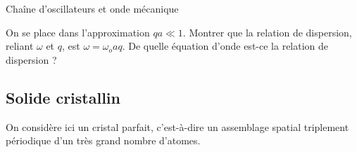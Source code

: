 \begin{exo}[PC][1][devoir]{Chaîne d'oscillateurs et onde mécanique}
\begin{quest}
\item On se place dans l'approximation $qa \ll 1$. Montrer que la relation de dispersion, reliant $\omega$ et $q$, est $\omega=\omega_{o}a q$. De quelle équation d'onde est-ce la relation de dispersion ?






\end{quest}

\subsection{Solide cristallin}
On considère ici un cristal parfait, c'est-à-dire un assemblage spatial triplement périodique d'un très grand nombre d'atomes.


\end{exo}
